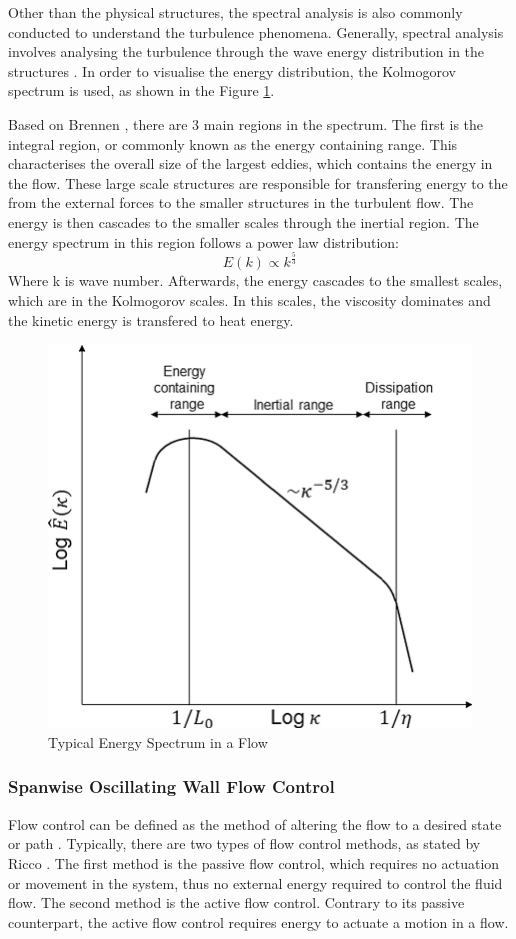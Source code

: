 Other than the physical structures, the spectral analysis is also commonly conducted to understand the turbulence phenomena. Generally, spectral analysis involves analysing the turbulence through the wave energy distribution in the structures \cite{Fan2023}. In order to visualise the energy distribution, the Kolmogorov spectrum is used, as shown in the Figure \ref{fig:specturb}.

Based on Brennen \cite{Brennen2004}, there are 3 main regions in the spectrum. The first is the integral region, or commonly known as the energy containing range. This characterises the overall size of the largest eddies, which contains the energy in the flow. These large scale structures are responsible for transfering energy to the from the external forces to the smaller structures in the turbulent flow. The energy is then cascades to the smaller scales through the inertial region. The energy spectrum in this region follows a power law distribution:
\begin{equation}
    E(k) \propto k^{\frac53}
\end{equation}
Where k is wave number. Afterwards, the energy cascades to the smallest scales, which are in the Kolmogorov scales. In this scales, the viscosity dominates and the kinetic energy is transfered to heat energy.

\begin{figure}
    \centering
    \includegraphics[width=0.65\linewidth]{Figures/KolmogorovSpectrum.png}
    \caption{Typical Energy Spectrum in a Flow ~\cite{kalmar-Nagy2019}}
    \label{fig:specturb}
\end{figure}




\subsubsection{Spanwise Oscillating Wall Flow Control}
\label{sec:litrev_oscwallfc}
Flow control can be defined as the method of altering the flow to a desired state or path \cite{Jahamiri2010}. Typically, there are two types of flow control methods, as stated by Ricco \cite{Ricco2021}. The first method is the passive flow control, which requires no actuation or movement in the system, thus no external energy required to control the fluid flow. The second method is the active flow control. Contrary to its passive counterpart, the active flow control requires energy to actuate a motion in a flow. 

